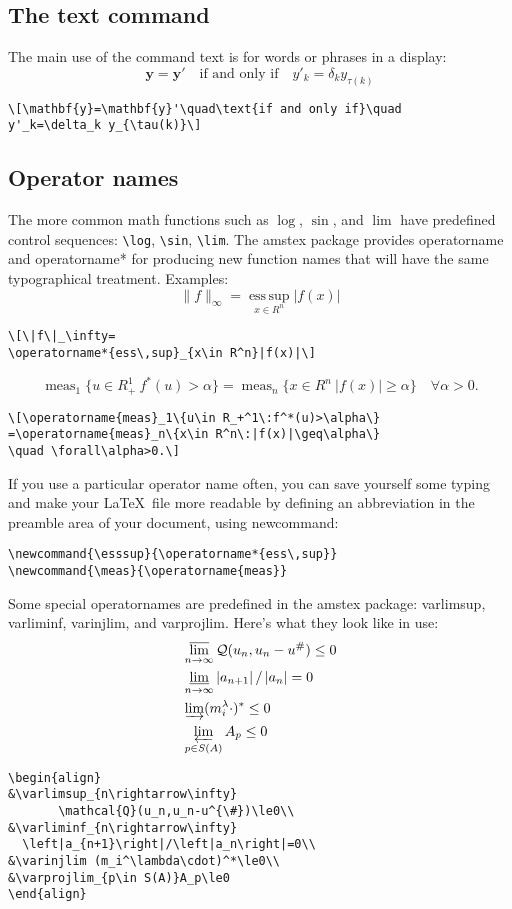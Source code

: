 \documentclass[draft]{amsart}
\newcommand{\ntt}{\normalfont\ttfamily}
\newcommand{\cn}[1]{{\protect\ntt\bslash#1}}
\newcommand{\pkg}[1]{{\protect\ntt#1}}
\theoremstyle{definition}
\theoremstyle{remark}
\begin{document}
\subsection{The \cn{text} command}
The main use of the command \cn{text} is for words or phrases in a
display:
\[\mathbf{y}=\mathbf{y}'\quad\text{if and only if}\quad
y'_k=\delta_k y_{\tau(k)}\]
\begin{verbatim}
\[\mathbf{y}=\mathbf{y}'\quad\text{if and only if}\quad
y'_k=\delta_k y_{\tau(k)}\]
\end{verbatim}

\subsection{Operator names}
The more common math functions such as $\log$, $\sin$, and $\lim$
have predefined control sequences: \verb=\log=, \verb=\sin=,
\verb=\lim=.
The \pkg{amstex} package provides \cn{operatorname} and
\cn{operatorname*}
for producing new function names that will have the
same typographical treatment.
Examples:
\[\|f\|_\infty=
\operatorname*{ess\,sup}_{x\in R^n}|f(x)|\]
\begin{verbatim}
\[\|f\|_\infty=
\operatorname*{ess\,sup}_{x\in R^n}|f(x)|\]
\end{verbatim}
\[\operatorname{meas}_1\{u\in R_+^1\:f^*(u)>\alpha\}
=\operatorname{meas}_n\{x\in R^n\:|f(x)|\geq\alpha\}
\quad \forall\alpha>0.\]
\begin{verbatim}
\[\operatorname{meas}_1\{u\in R_+^1\:f^*(u)>\alpha\}
=\operatorname{meas}_n\{x\in R^n\:|f(x)|\geq\alpha\}
\quad \forall\alpha>0.\]
\end{verbatim}
If you use a particular operator name often, you
can save yourself some typing and make
your \LaTeX\ file more readable by defining an abbreviation
in the preamble area of your document, using \cn{newcommand}:
\begin{verbatim}
\newcommand{\esssup}{\operatorname*{ess\,sup}}
\newcommand{\meas}{\operatorname{meas}}
\end{verbatim}

Some special operatornames are predefined in the
\pkg{amstex} package:
\cn{varlimsup}, \cn{varliminf}, \cn{varinjlim},
and \cn{varprojlim}.
Here's what they look like in use:
\begin{align}
&\varlimsup_{n\rightarrow\infty}
       \mathcal{Q}(u_n,u_n-u^{\#})\le0\\
&\varliminf_{n\rightarrow\infty}
  \left|a_{n+1}\right|/\left|a_n\right|=0\\
&\varinjlim (m_i^\lambda\cdot)^*\le0\\
&\varprojlim_{p\in S(A)}A_p\le0
\end{align}
\begin{verbatim}
\begin{align}
&\varlimsup_{n\rightarrow\infty}
       \mathcal{Q}(u_n,u_n-u^{\#})\le0\\
&\varliminf_{n\rightarrow\infty}
  \left|a_{n+1}\right|/\left|a_n\right|=0\\
&\varinjlim (m_i^\lambda\cdot)^*\le0\\
&\varprojlim_{p\in S(A)}A_p\le0
\end{align}
\end{verbatim}
\end{document}
